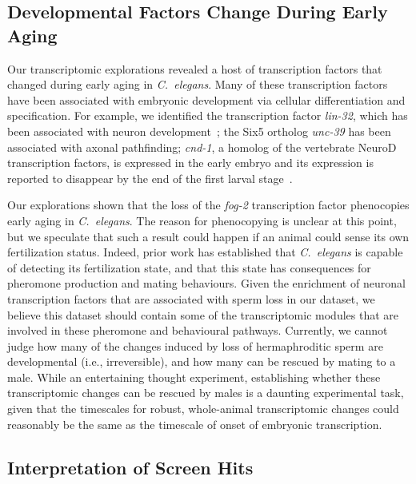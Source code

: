 \documentclass[9pt,twocolumn,twoside]{gsag3jnl}
\newcommand{\cel}{\emph{C.~elegans}}
\newcommand{\fog}{\emph{fog-2}}
\begin{document}
\subsection*{Developmental Factors Change During Early Aging}
\label{sub:development_in_aging}

Our transcriptomic explorations revealed a host of transcription factors that changed during early aging in \cel{}. Many of these transcription factors have been associated with embryonic development via cellular differentiation and specification. For example, we identified the transcription factor \emph{lin-32}, which has been associated with neuron development~\citep{}; the Six5 ortholog \emph{unc-39} has been associated with axonal pathfinding; \emph{cnd-1}, a homolog  of the vertebrate NeuroD transcription factors, is expressed in the early embryo and its expression is reported to disappear by the end of the first larval stage~\citep{}.

Our explorations shown that the loss of the \fog{} transcription factor phenocopies early aging in \cel{}. The reason for phenocopying is unclear at this point, but we speculate that such a result could happen if an animal could sense its own fertilization status. Indeed, prior work has established that \cel{} is capable of detecting its fertilization state, and that this state has consequences for pheromone production and mating behaviours.
Given the enrichment of neuronal transcription factors that are associated with sperm loss in our dataset, we believe this dataset should contain some of the transcriptomic modules that are involved in these pheromone and behavioural pathways. Currently, we cannot judge how many of the changes induced by loss of hermaphroditic sperm are developmental (i.e., irreversible), and how many can be rescued by mating to a male. While an entertaining thought experiment, establishing whether these transcriptomic changes can be rescued by males is a daunting experimental task, given that the timescales for robust, whole-animal transcriptomic changes could reasonably be the same as the timescale of onset of embryonic transcription.

\subsection*{Interpretation of Screen Hits}
\label{sub:Interpretation of Screen Hits}



\end{document}
